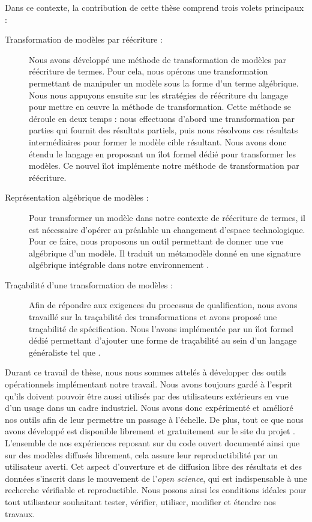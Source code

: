 Dans ce contexte, la contribution de cette thèse comprend trois volets
principaux :
\begin{description}

  \item[Transformation de modèles par réécriture : ] Nous avons développé une
    méthode de transformation de modèles par réécriture de termes. Pour cela,
    nous opérons une transformation permettant de manipuler un modèle sous la
    forme d'un terme algébrique. Nous nous appuyons ensuite sur les stratégies
    de réécriture du langage {\tom} pour mettre en œuvre la méthode de
    transformation. Cette méthode se déroule en deux temps : nous effectuons
    d'abord une transformation par parties qui fournit des résultats partiels,
    puis nous résolvons ces résultats intermédiaires pour former le modèle
    cible résultant. Nous avons donc étendu le langage {\tom} en proposant un
    îlot formel dédié pour transformer les modèles. Ce nouvel îlot implémente
    notre méthode de transformation par réécriture.

  \item[Représentation algébrique de modèles : ] Pour transformer un modèle
    dans notre con\-tex\-te de réécriture de termes, il est nécessaire d'opérer au
    préalable un changement d'espace technologique. Pour ce faire, nous
    proposons un outil permettant de donner une vue algébrique d'un modèle. Il
    traduit un métamodèle donné en une signature algébrique intégrable dans
    notre environnement {\tom}.

  \item[Traçabilité d'une transformation de modèles : ] Afin de répondre aux
    exigences du processus de qualification, nous avons travaillé sur la
    traçabilité des transformations et avons proposé une traçabilité de
    spécification. Nous l'avons implémentée par un îlot formel dédié permettant
    d'ajouter une forme de traçabilité au sein d'un langage généraliste tel que
    {\java}.

\end{description}


Durant ce travail de thèse, nous nous sommes attelés à développer des outils
opérationnels implémentant notre travail. Nous avons toujours gardé à l'esprit
qu'ils doivent pouvoir être aussi utilisés par des utilisateurs extérieurs en
vue d'un usage dans un cadre industriel. Nous avons donc expérimenté et
amélioré nos outils afin de leur permettre un passage à l'échelle. De plus,
tout ce que nous avons développé est disponible librement et gratuitement sur
le site du projet {\tom}. L'ensemble de nos expériences reposant sur du code
ouvert documenté ainsi que sur des modèles diffusés librement, cela assure leur
reproductibilité par un utilisateur averti. Cet aspect d'ouverture et de
diffusion libre des résultats et des données s'inscrit dans le mouvement de
l'\emph{open science}, qui est indispensable à une recherche vérifiable et
reproductible. Nous posons ainsi les conditions idéales pour tout utilisateur
souhaitant tester, vérifier, utiliser, modifier et étendre nos travaux.

